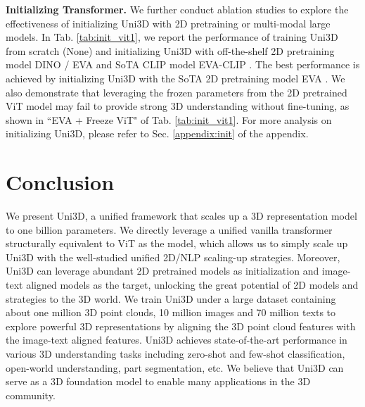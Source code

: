 \documentclass{article} \usepackage{iclr2024_conference,times}
\def\Ours{Uni3D\xspace}
\begin{document}
\textbf{Initializing Transformer.} 
\label{sec.init}
We further conduct ablation studies to explore the effectiveness of initializing \Ours with 2D pretraining or multi-modal large models. In Tab. \ref{tab:init_vit1}, we report the performance of training \Ours from scratch (None) and initializing \Ours with off-the-shelf 2D pretraining model DINO \citep{caron2021emerging} / EVA \citep{fang2023eva} and SoTA CLIP model EVA-CLIP \citep{sun2023eva}. The best performance is achieved by initializing \Ours with the SoTA 2D pretraining model EVA \citep{fang2023eva}. We also demonstrate that leveraging the frozen parameters from the 2D pretrained ViT model may fail to provide strong 3D understanding without fine-tuning, as shown in ``EVA + Freeze ViT" of Tab. \ref{tab:init_vit1}. For more analysis on initializing \Ours, please refer to Sec. \ref{appendix:init} of the appendix.




    





\section{Conclusion}
We present \Ours, a unified framework that scales up a 3D representation model to one billion parameters. We directly leverage a unified vanilla transformer structurally equivalent to ViT as the model, which allows us to simply scale up \Ours with the well-studied unified 2D/NLP scaling-up strategies. Moreover, Uni3D can leverage abundant 2D pretrained models as initialization and image-text aligned models as the target, unlocking the great potential of 2D models and strategies to the 3D world. We train \Ours under a large dataset containing about one million 3D point clouds, 10 million images and 70 million texts to explore powerful 3D representations by aligning the 3D point cloud features with the image-text aligned features.  \Ours achieves state-of-the-art performance in various 3D understanding tasks including zero-shot and few-shot classification, open-world understanding, part segmentation, etc.
We believe that \Ours can serve as a 3D foundation model to enable many applications in the 3D community.





\clearpage
\appendix
\end{document}
